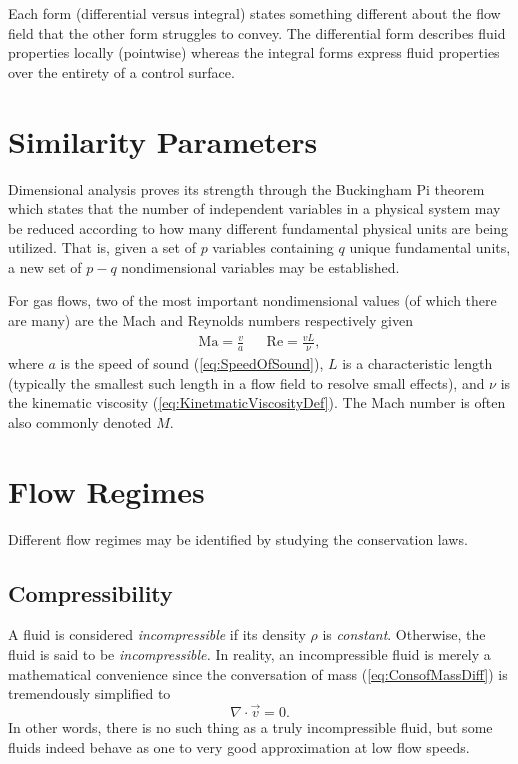 \documentclass[11pt,dvipsnames]{thesis}
\begin{document}
Each form (differential versus integral) states something different about the flow field that the other form struggles to convey. The differential form describes fluid properties locally (pointwise) whereas the integral forms express fluid properties over the entirety of a control surface.


\section{Similarity Parameters}
Dimensional analysis proves its strength through the Buckingham Pi theorem which 
states that the number of independent variables in a physical system may be reduced according to how many different fundamental physical units are being utilized. That is, given a set of $p$ variables containing $q$ unique fundamental units, a new set of $p - q$ nondimensional variables may be established.

For gas flows, two of the most important nondimensional values (of which there are many) are the Mach and Reynolds numbers respectively given
\begin{align}
\mathrm{Ma} = \frac{v}{a} && \mathrm{Re} = \frac{v L}{\nu},
\end{align}
where $a$ is the speed of sound (\ref{eq:SpeedOfSound}), $L$ is a characteristic length (typically the smallest such length in a flow field to resolve small effects), and $\nu$ is the kinematic viscosity (\ref{eq:KinetmaticViscosityDef}).
The Mach number is often also commonly denoted $M$.

\section{Flow Regimes}
Different flow regimes may be identified by studying the conservation laws.
\subsection{Compressibility}
A fluid is considered \textit{incompressible} if its density $\rho$ is \textit{constant}. Otherwise, the fluid is said to be \textit{incompressible.} In reality, an incompressible fluid is merely a mathematical convenience since the conversation of mass (\ref{eq:ConsofMassDiff}) is tremendously simplified to
\begin{equation}
\nabla \cdot \vec{v} = 0. \label{eq:ConsofMassDiffIncomp}
\end{equation}
In other words, there is no such thing as a truly incompressible fluid, but some fluids indeed behave as one to very good approximation at low flow speeds. 
\end{document}
